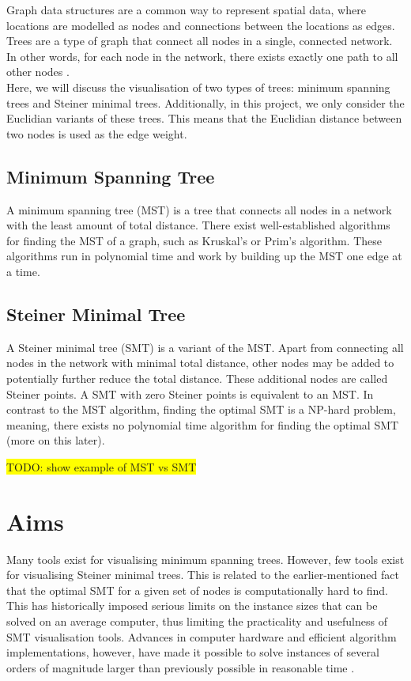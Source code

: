 \documentclass{l4proj}
\begin{document}
Graph data structures are a common way to represent spatial data, where locations are modelled as nodes and connections between the locations as edges. Trees are a type of graph that connect all nodes in a single, connected network. In other words, for each node in the network, there exists exactly one path to all other nodes \citep{tree_graph_theory}.
\\
Here, we will discuss the visualisation of two types of trees: minimum spanning trees and Steiner minimal trees. Additionally, in this project, we only consider the Euclidian variants of these trees. This means that the Euclidian distance between two nodes is used as the edge weight.

\subsection{Minimum Spanning Tree}
A minimum spanning tree (MST) is a tree that connects all nodes in a network with the least amount of total distance.
There exist well-established algorithms for finding the MST of a graph, such as Kruskal's or Prim's algorithm. These algorithms run in polynomial time and work by building up the MST one edge at a time.
\subsection{Steiner Minimal Tree}
A Steiner minimal tree (SMT) is a variant of the MST.
Apart from connecting all nodes in the network with minimal total distance, other nodes may be added to potentially further reduce the total distance. These additional nodes are called Steiner points.
A SMT with zero Steiner points is equivalent to an MST. In contrast to the MST algorithm, finding the optimal SMT is a NP-hard problem, meaning, there exists no polynomial time algorithm for finding the optimal SMT (more on this later).

\colorbox{yellow}{TODO: show example of MST vs SMT}



\section{Aims}
Many tools exist for visualising minimum spanning trees. However, few tools exist for visualising Steiner minimal trees. This is related to the earlier-mentioned fact that the optimal SMT for a given set of nodes is computationally hard to find. This has historically imposed serious limits on the instance sizes that can be solved on an average computer, thus limiting the practicality and usefulness of SMT visualisation tools.
Advances in computer hardware and efficient algorithm implementations, however, have made it possible to solve instances of several orders of magnitude larger than previously possible in reasonable time \citep{29ee725d11ac4584b72f7fe66c4326fa}.
\end{document}

